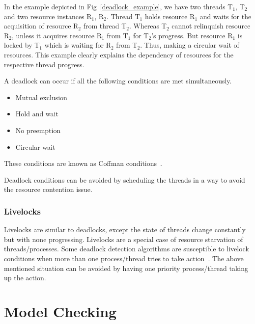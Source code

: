 In the example depicted in Fig~\ref{deadlock_example}, we have two threads T$_1$, T$_2$ and two resource instances R$_1$, R$_2$. 
Thread T$_1$ holds resource R$_1$ and waits for the acquisition of resource R$_2$ from thread T$_2$. 
Whereas T$_2$ cannot relinquish resource R$_2$, unless it acquires resource R$_1$ from T$_1$ for T$_2$'s progress. 
But resource R$_1$ is locked by T$_1$ which is waiting for R$_2$ from T$_2$. 
Thus, making a circular wait of resources. 
This example clearly explains the dependency of resources for the respective thread progress. 

A deadlock can occur if all the following conditions are met simultaneously.

\begin{itemize}
\item	Mutual exclusion
\item	Hold and wait
\item	No preemption
\item	Circular wait
\end{itemize}

These conditions are known as Coffman conditions~\citep{coffman_cond}.

Deadlock conditions can be avoided by scheduling the threads in a way to avoid the resource contention issue.

\subsubsection{Livelocks}

Livelocks are similar to deadlocks, except the state of threads change constantly but with none progressing. 
Livelocks are a special case of resource starvation of threads/processes. 
Some deadlock detection algorithms are susceptible to livelock conditions when more than one process/thread tries to take action~\citep{lopez2017study}\citep{chaki2005concurrent}. 
The above mentioned situation can be avoided by having one priority process/thread taking up the action. 

\section{Model Checking \label{model_check}}

